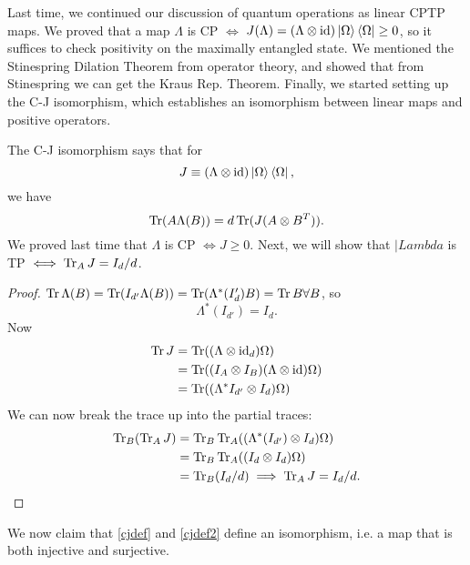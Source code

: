 Last time, we continued our discussion of quantum operations as linear CPTP maps. We proved that a map $\Lambda$ is CP $\iff$ $J(\Lambda)=(\Lambda \otimes \operatorname{id})\left| \Omega \right>\left< \Omega \right|\geq 0$, so it suffices to check positivity on the maximally entangled state. We mentioned the Stinespring Dilation Theorem from operator theory, and showed that from Stinespring we can get the Kraus Rep. Theorem. Finally, we started setting up the C-J isomorphism, which establishes an isomorphism between linear maps and positive operators.

The C-J isomorphism says that for
\begin{equation}\label{cjdef}
    J\equiv (\Lambda \otimes \operatorname{id})\left| \Omega \right>\left< \Omega \right|,
\end{equation}
we have
\begin{equation}\label{cjdef2}
    \operatorname{Tr}(A\Lambda(B))=d\operatorname{Tr}(J(A\otimes B^T)).
\end{equation}
We proved last time that $\Lambda$ is CP $\iff J\geq 0$. Next, we will show that $|Lambda$ is TP $\iff \operatorname{Tr}_A J =I_d/d$.
\begin{proof}
    $\operatorname{Tr} \Lambda(B)=\operatorname{Tr}(I_{d'}\Lambda(B))=\operatorname{Tr}(\Lambda^*(I_d')B)=\operatorname{Tr} B\forall B$,
    so
    \begin{equation}
        \Lambda^*(I_{d'})=I_d.
    \end{equation}
    Now
    \begin{align*}
        \operatorname{Tr} J &= \operatorname{Tr}((\Lambda \otimes \operatorname{id}_d)\Omega)\\
            &=\operatorname{Tr}((I_A\otimes I_B)(\Lambda \otimes \operatorname{id})\Omega)\\
            &=\operatorname{Tr}((\Lambda^* I_{d'} \otimes I_d)\Omega)
    \end{align*}
    We can now break the trace up into the partial traces:
    \begin{align*}
        \operatorname{Tr}_B(\operatorname{Tr}_A J) &= \operatorname{Tr}_B \operatorname{Tr}_A((\Lambda^* (I_{d'})\otimes I_d) \Omega)\\
            &= \operatorname{Tr}_B \operatorname{Tr}_A((I_d\otimes I_d) \Omega)\\
            &= \operatorname{Tr}_B(I_d/d) \implies \operatorname{Tr}_A J = I_d/d.\qedhere
    \end{align*}
\end{proof}
We now claim that \ref{cjdef} and \ref{cjdef2} define an isomorphism, i.e. a map that is both injective and surjective.

